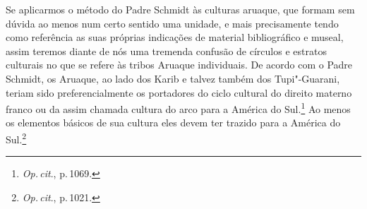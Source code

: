 Se aplicarmos o método do Padre Schmidt às culturas aruaque, que formam
sem dúvida ao menos num certo sentido uma unidade, e mais precisamente
tendo como referência as suas próprias indicações de material
bibliográfico e museal, assim teremos diante de nós uma tremenda
confusão de círculos e estratos culturais no que se refere às tribos
Aruaque individuais. De acordo com o Padre Schmidt, os Aruaque, ao lado
dos Karib e talvez também dos Tupi"-Guarani, teriam sido
preferencialmente os portadores do ciclo cultural do direito materno
franco ou da assim
chamada cultura do arco para a América do Sul.\footnote{\textit{Op.\,cit}., p.\,1069.} Ao menos os elementos básicos de sua cultura eles devem ter
trazido para a América do Sul.\footnote{\textit{Op.\,cit}., p.\,1021.}


